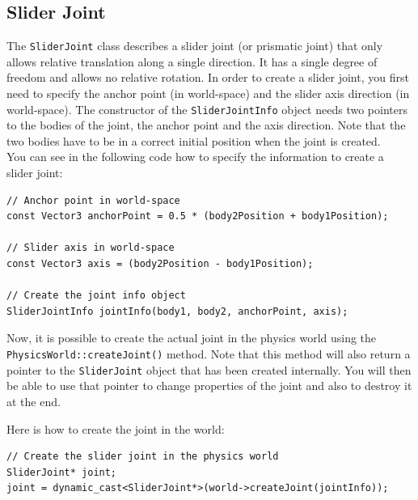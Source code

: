 \documentclass[a4paper,12pt]{article}
\begin{document}
    \subsection{Slider Joint}

    The \texttt{SliderJoint} class describes a slider joint (or prismatic joint) that only allows relative translation along a single direction. It has a single degree of freedom and allows no
    relative rotation. In order to create a slider joint, you first need to specify the anchor point (in world-space) and the slider axis direction (in world-space). The constructor of the
    \texttt{SliderJointInfo} object needs two pointers to the bodies of the joint, the anchor point and the axis direction. Note that the two bodies have to be in a correct initial position when
    the joint is created. \\

    You can see in the following code how to specify the information to create a slider joint: \\

    \begin{lstlisting}
// Anchor point in world-space
const Vector3 anchorPoint = 0.5 * (body2Position + body1Position);

// Slider axis in world-space
const Vector3 axis = (body2Position - body1Position);

// Create the joint info object
SliderJointInfo jointInfo(body1, body2, anchorPoint, axis);
  \end{lstlisting}

    \vspace{0.6cm}

    \begin{sloppypar}
    Now, it is possible to create the actual joint in the physics world using the \texttt{PhysicsWorld::createJoint()} method.
    Note that this method will also return a pointer to the \texttt{SliderJoint} object that has been created internally. You will then
    be able to use that pointer to change properties of the joint and also to destroy it at the end. \\
    \end{sloppypar}

    Here is how to create the joint in the world: \\

    \begin{lstlisting}
// Create the slider joint in the physics world
SliderJoint* joint;
joint = dynamic_cast<SliderJoint*>(world->createJoint(jointInfo));
  \end{lstlisting}
\end{document}
